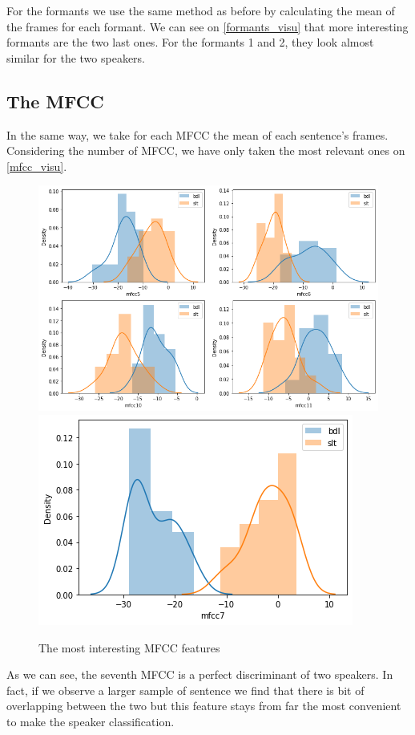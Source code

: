 \documentclass[]{article}
\begin{document}
For the formants we use the same method as before by calculating the mean of the frames for
each formant. We can see on \autoref{formants_visu} that more interesting formants are the two
last ones. For the formants 1 and 2, they look almost similar for the two speakers.

\subsection{The MFCC}

In the same way, we take for each MFCC the mean of each sentence's frames. Considering
the number of MFCC, we have only taken the most relevant ones on \autoref{mfcc_visu}. 

\begin{figure}[H]
    \centering
    \caption{\label{mfcc_visu}The most interesting MFCC features}
    \includegraphics[scale=0.5]{images/mfcc_visu.png}
    \includegraphics[scale=0.5]{images/mfcc7_visu.png}
\end{figure}

As we can see, the seventh MFCC is a perfect discriminant of two speakers. In fact,
if we observe a larger sample of sentence we find that there is bit of overlapping 
between the two but this feature stays from far the most convenient to make the
speaker classification.
\end{document}
